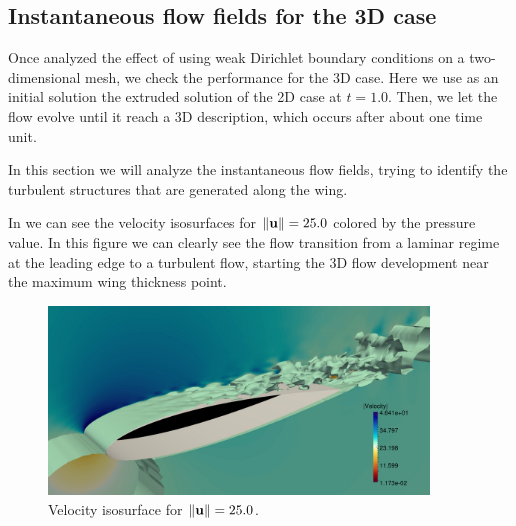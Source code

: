 \subsection{Instantaneous flow fields for the 3D case}
Once analyzed the effect of using weak Dirichlet boundary conditions on a two-dimensional mesh, we check the performance for the 3D case. Here we use as an initial solution the extruded solution of the 2D case at $ t=1.0 $. Then, we let the flow evolve until it reach a 3D description, which occurs after about one time unit.

In this section we will analyze the instantaneous flow fields, trying to identify the turbulent structures that are generated along the wing.

In  we can see the velocity isosurfaces for $ \|{\bf u}\|=25.0 $ colored by the pressure value. In this figure we can clearly see the flow transition from a laminar regime at the leading edge to a turbulent flow, starting the 3D flow development near the maximum wing thickness point.
\begin{figure}[h!]
  \centering
  \includegraphics[width=0.9\textwidth]{Figures/Chapter8/weak/velo_3d}
  \caption{Velocity isosurface for $ \|{\bf u}\|=25.0  $.}
  \label{fig-NACA_3D_velo}
\end{figure}


